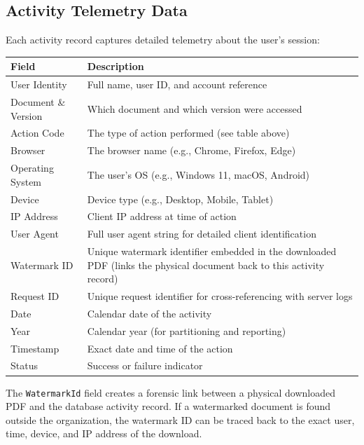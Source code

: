 \subsection{Activity Telemetry Data}

Each activity record captures detailed telemetry about the
user's session:

\begin{tabularx}{\textwidth}{@{} l X @{}}
  \toprule
  \textbf{Field} & \textbf{Description} \\
  \midrule
  User Identity
    & Full name, user ID, and account reference \\
  Document \& Version
    & Which document and which version were
      accessed \\
  Action Code
    & The type of action performed (see table
      above) \\
  Browser
    & The browser name (e.g., Chrome, Firefox,
      Edge) \\
  Operating System
    & The user's OS (e.g., Windows 11, macOS,
      Android) \\
  Device
    & Device type (e.g., Desktop, Mobile,
      Tablet) \\
  IP Address
    & Client IP address at time of action \\
  User Agent
    & Full user agent string for detailed
      client identification \\
  Watermark ID
    & Unique watermark identifier embedded in
      the downloaded PDF (links the physical
      document back to this activity record) \\
  Request ID
    & Unique request identifier for
      cross-referencing with server logs \\
  Date
    & Calendar date of the activity \\
  Year
    & Calendar year (for partitioning and
      reporting) \\
  Timestamp
    & Exact date and time of the action \\
  Status
    & Success or failure indicator \\
  \bottomrule
\end{tabularx}

\begin{ugImportant}
  The \texttt{WatermarkId} field creates a forensic link
  between a physical downloaded PDF and the database activity
  record. If a watermarked document is found outside the
  organization, the watermark ID can be traced back to the
  exact user, time, device, and IP address of the download.
\end{ugImportant}

